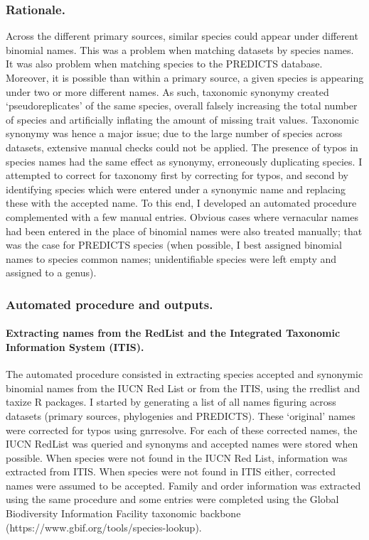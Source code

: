 \subsubsection{Rationale.}
Across the different primary sources, similar species could appear under different binomial names. This was a problem when matching datasets by species names. It was also problem when matching species to the PREDICTS database. Moreover, it is possible than within a primary source, a given species is appearing under two or more different names. As such, taxonomic synonymy created `pseudoreplicates' of the same species, overall falsely increasing the total number of species and artificially inflating the amount of missing trait values. Taxonomic synonymy was hence a major issue; due to the large number of species across datasets, extensive manual checks could not be applied. The presence of typos in species names had the same effect as synonymy, erroneously duplicating species. I attempted to correct for taxonomy first by correcting for typos, and second by identifying species which were entered under a synonymic name and replacing these with the accepted name. To this end, I developed an automated procedure complemented with a few manual entries. Obvious cases where vernacular names had been entered in the place of binomial names were also treated manually; that was the case for PREDICTS species (when possible, I best assigned binomial names to species common names; unidentifiable species were left empty and assigned to a genus).

\subsubsection{Automated procedure and outputs.}
\paragraph{Extracting names from the RedList and the Integrated Taxonomic Information System (ITIS).}
The automated procedure consisted in extracting species accepted and synonymic binomial names from the IUCN Red List or from the ITIS, using the rredlist and taxize R packages. I started by generating a list of all names figuring across datasets (primary sources, phylogenies and PREDICTS). These `original' names were corrected for typos using gnr\textunderscore resolve. For each of these corrected names, the IUCN RedList was queried and synonyms and accepted names were stored when possible. When species were not found in the IUCN Red List, information was extracted from ITIS. When species were not found in ITIS either, corrected names were assumed to be accepted. Family and order information was extracted using the same procedure and some entries were completed using the Global Biodiversity Information Facility taxonomic backbone (https://www.gbif.org/tools/species-lookup).

